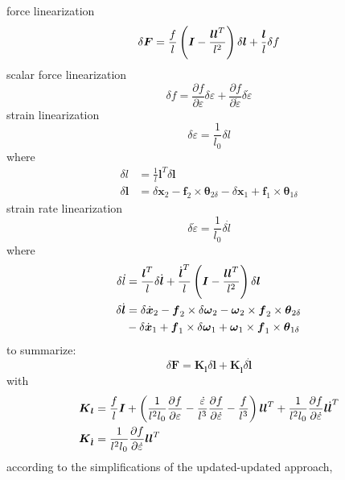 \documentclass[10pt,dvips,fleqn]{report}
\newcommand{\T}[1]{\boldsymbol{#1}}
\begin{document}
force linearization
\begin{equation}
	\delta\T{F} = \frac{f}{l}\plbr{\T{I} - \frac{\T{l}\T{l}^T}{l^2}} \delta\T{l} + \frac{\T{l}}{l} \delta{f}
\end{equation}
scalar force linearization
\begin{equation}
	\delta{f} = \frac{\partial{f}}{\partial\varepsilon} \delta\varepsilon
	+ \frac{\partial{f}}{\partial\dot{\varepsilon}} \delta\dot{\varepsilon}
\end{equation}
strain linearization
\begin{equation}
	\delta\varepsilon = \frac{1}{l_0}\delta{l}
\end{equation}
where
\begin{align}
	\delta{l} &= \frac{1}{l}\T{l}^T \delta\T{l} \\
	\delta\T{l} &= \delta\T{x}_2 - \T{f}_2 \times \T{\theta}_{2\delta}
		- \delta\T{x}_1 + \T{f}_1 \times \T{\theta}_{1\delta}
\end{align}
strain rate linearization
\begin{equation}
	\delta\dot{\varepsilon} = \frac{1}{l_0} \delta\dot{l}
\end{equation}
where
\begin{align}
	\delta\dot{l} &= \frac{\T{l}^T}{l} \delta\dot{\T{l}}
		+ \frac{\dot{\T{l}}^T}{l}\plbr{\T{I} - \frac{\T{l}\T{l}^T}{l^2}} \delta\T{l} \\
	\delta\dot{\T{l}} &= \delta\dot{\T{x}}_2
		- \T{f}_2 \times \delta\T{\omega}_2 - \T{\omega}_2 \times \T{f}_2 \times \T{\theta}_{2\delta}
		\nonumber \\
		& \mbox{} - \delta\dot{\T{x}}_1
		+ \T{f}_1 \times \delta\T{\omega}_1 + \T{\omega}_1 \times \T{f}_1 \times \T{\theta}_{1\delta}
\end{align}
to summarize:
\begin{equation}
	\delta\T{F} = \T{K}_{\T{l}} \delta\T{l} + \T{K}_{\dot{\T{l}}} \delta\dot{\T{l}}
\end{equation}
with
\begin{align}
	\T{K}_{\T{l}} &= \frac{f}{l} \T{I}
		+ \plbr{
			\frac{1}{l^2 l_0} \frac{\partial{f}}{\partial\varepsilon}
			- \frac{\dot{\varepsilon}}{l^3} \frac{\partial{f}}{\partial\dot{\varepsilon}}
			- \frac{f}{l^3}
		}\T{l}\T{l}^T
		+ \frac{1}{l^2 l_0} \frac{\partial{f}}{\partial\dot{\varepsilon}} \T{l}\dot{\T{l}}^T \\
	\T{K}_{\dot{\T{l}}} &= \frac{1}{l^2 l_0} \frac{\partial{f}}{\partial\dot{\varepsilon}} \T{l}\T{l}^T
\end{align}
according to the simplifications of the updated-updated approach,
\end{document}

